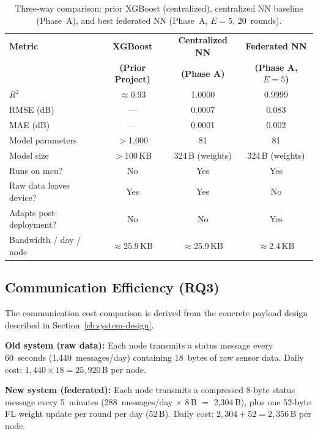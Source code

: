 \documentclass[12pt, a4paper, twoside, openright]{report}
\begin{document}
\begin{table}[H]
  \centering
  \begin{tabular}{lccc}
    \toprule
    \textbf{Metric} &
    \textbf{XGBoost} & \textbf{Centralized NN} & \textbf{Federated NN} \\
    & \textbf{(Prior Project)} & \textbf{(Phase A)} & \textbf{(Phase A, $E=5$)} \\
    \midrule
    $R^2$                   & $\approx 0.93$ & 1.0000           & 0.9999           \\
    RMSE (dB)               & ---            & 0.0007           & 0.083            \\
    MAE (dB)                & ---            & 0.0001           & 0.002            \\
    Model parameters        & $>$1{,}000     & 81               & 81               \\
    Model size              & $>$100\,KB     & 324\,B (weights) & 324\,B (weights) \\
    Runs on \gls{mcu}?      & No             & Yes              & Yes              \\
    Raw data leaves device? & Yes            & Yes              & No               \\
    Adapts post-deployment? & No             & No               & Yes              \\
    Bandwidth / day / node  & $\approx$25.9\,KB & $\approx$25.9\,KB & $\approx$2.4\,KB \\
    \bottomrule
  \end{tabular}
  \caption{Three-way comparison: prior XGBoost (centralized), centralized NN
    baseline (Phase~A), and best federated NN (Phase~A, $E=5$, 20~rounds).}
  \label{tab:three-way}
\end{table}

\subsection{Communication Efficiency (RQ3)}
\label{sec:comm-efficiency}

The communication cost comparison is derived from the concrete payload design described in Section~\ref{ch:system-design}.

\noindent\textbf{Old system (raw data):} Each node transmits a status message every 60~seconds (1{,}440~messages/day) containing 18~bytes of raw sensor data. Daily cost: $1{,}440 \times 18 = 25{,}920$\,B per node.

\noindent\textbf{New system (federated):} Each node transmits a compressed 8-byte status message every 5~minutes (288~messages/day $\times$ 8\,B $=$ 2{,}304\,B), plus one 52-byte FL weight update per round per day (52\,B). Daily cost: $2{,}304 + 52 = 2{,}356$\,B per node.
\end{document}
